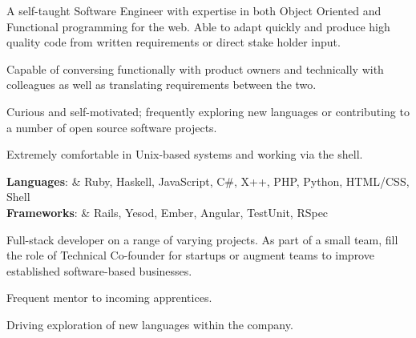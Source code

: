 




     \selectfont

    \begin{resheader}{\name}{\email}{\addr}{\phone}
        A self-taught Software Engineer with expertise in both Object
        Oriented and Functional programming for the web. Able to adapt
        quickly and produce high quality code from written requirements
        or direct stake holder input.
    \end{resheader}


    \begin{reslist}
        \item{Capable of conversing functionally with product owners and
          technically with colleagues as well as translating requirements
          between the two.}
        \item{Curious and self-motivated; frequently exploring new languages or
          contributing to a number of open source software projects.}
        \item{Extremely comfortable in Unix-based systems and working via the
          shell.}
    \end{reslist}


    \begin{restable}
        {\bf Languages}:  & Ruby, Haskell, JavaScript, C\#, X++, PHP, Python,
                            HTML/CSS, Shell \\
        {\bf Frameworks}: & Rails, Yesod, Ember, Angular, TestUnit, RSpec \\
    \end{restable}



    Full-stack developer on a range of varying projects. As part of a small
    team, fill the role of Technical Co-founder for startups or augment teams to
    improve established software-based businesses.

    \begin{reslist}
      \item{Frequent mentor to incoming apprentices.}
      \item{Driving exploration of new languages within the company.}
    \end{reslist}

